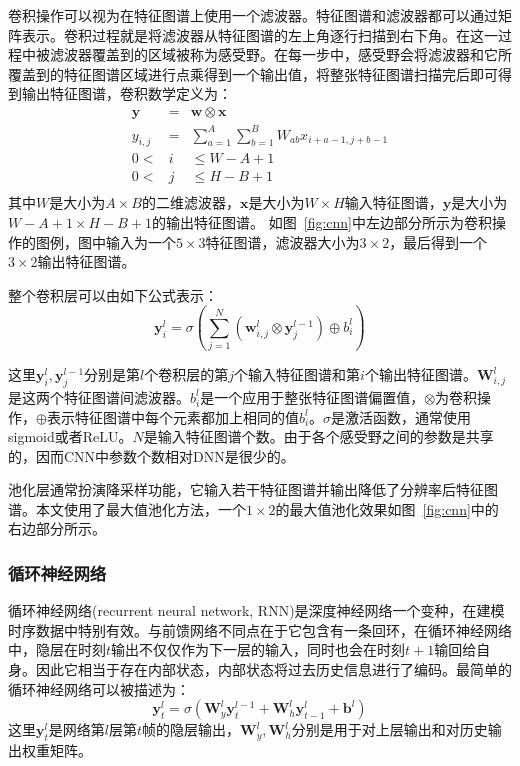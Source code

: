 卷积操作可以视为在特征图谱上使用一个滤波器。特征图谱和滤波器都可以通过矩阵表示。卷积过程就是将滤波器从特征图谱的左上角逐行扫描到右下角。在这一过程中被滤波器覆盖到的区域被称为感受野。在每一步中，感受野会将滤波器和它所覆盖到的特征图谱区域进行点乘得到一个输出值，将整张特征图谱扫描完后即可得到输出特征图谱，卷积数学定义为：
\begin{eqnarray}
    \mathbf{y} &=& \mathbf{w} \otimes \mathbf{x} \\
    y_{i,j} &=& \sum_{a=1}^A \sum_{b=1}^B W_{ab} x_{i+a-1, j+b-1} \\
    0 < &i& \le W-A+1 \\
    0 < &j& \le H-B+1 \\
\end{eqnarray}
其中$W$是大小为$A \times B$的二维滤波器，$\mathbf{x}$是大小为$W \times H$输入特征图谱，$\mathbf{y}$是大小为$W-A+1 \times H-B+1$的输出特征图谱。
如图~\ref{fig:cnn}中左边部分所示为卷积操作的图例，图中输入为一个$5 \times 3$特征图谱，滤波器大小为$3 \times 2$，最后得到一个$3 \times 2$输出特征图谱。

整个卷积层可以由如下公式表示：
\begin{equation}
    \mathbf{y}^{l}_{i} = \sigma ( \sum_{j=1}^{N} ( \mathbf{w}^{l}_{i,j} \otimes \mathbf{y}^{l-1}_{j} ) \oplus b^{l}_{i} )
\end{equation}

这里$\mathbf{y}^{l}_i, \mathbf{y}^{l-1}_j$分别是第$l$个卷积层的第$j$个输入特征图谱和第$i$个输出特征图谱。$\mathbf{W}^l_{i,j}$是这两个特征图谱间滤波器。$b^l_i$是一个应用于整张特征图谱偏置值，$\otimes$为卷积操作，$\oplus$表示特征图谱中每个元素都加上相同的值$b^l_i$。$\sigma$是激活函数，通常使用sigmoid或者ReLU。$N$是输入特征图谱个数。由于各个感受野之间的参数是共享的，因而CNN中参数个数相对DNN是很少的。

池化层通常扮演降采样功能，它输入若干特征图谱并输出降低了分辨率后特征图谱。本文使用了最大值池化方法，一个$1 \times 2$的最大值池化效果如图~\ref{fig:cnn}中的右边部分所示。

\subsubsection{循环神经网络}
循环神经网络(recurrent neural network, RNN)是深度神经网络一个变种，在建模时序数据中特别有效。与前馈网络不同点在于它包含有一条回环，在循环神经网络中，隐层在时刻$t$输出不仅仅作为下一层的输入，同时也会在时刻$t+1$输回给自身。因此它相当于存在内部状态，内部状态将过去历史信息进行了编码。最简单的循环神经网络可以被描述为：
\begin{equation}
    \mathbf{y}^l_t = \sigma(\mathbf{W}^l_y \mathbf{y}^{l-1}_t + \mathbf{W}^l_h \mathbf{y}^l_{t-1} + \mathbf{b}^l)
\end{equation}
这里$\mathbf{y}^l_t$是网络第$l$层第$t$帧的隐层输出，$\mathbf{W}^l_y, \mathbf{W}^l_h$分别是用于对上层输出和对历史输出权重矩阵。

